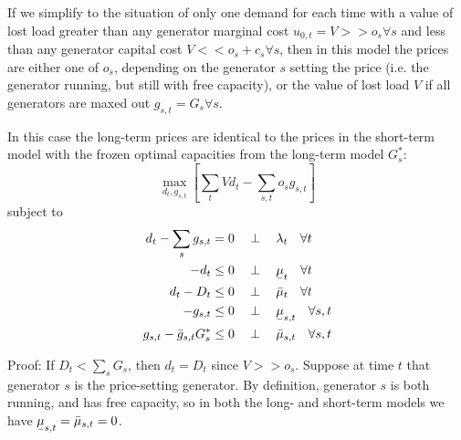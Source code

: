 \documentclass[final,3p,times]{elsarticle}
\def\l{\lambda} \def\K{\kappa} \def\m{\mu} \def\G{\Gamma} \def\d{\partial}
\begin{document}
If we simplify to the situation of only one demand for each time with a value of
lost load greater than any generator marginal cost $u_{0,t} = V >> o_s \forall
s$ and less than any generator capital cost $V << o_s + c_s \forall s$, then in
this model the prices are either one of $o_s$, depending on the generator $s$
setting the price (i.e. the generator running, but still with free capacity), or
the value of lost load $V$ if all generators are maxed out $g_{s,t} = G_s
\forall s$.

In this case the long-term prices are identical to the prices in the short-term
model with the frozen optimal capacities from the long-term model $G_{s}^*$:
\begin{equation}
  \max_{d_{t}, g_{s,t}}\left[\sum_{t} V d_{t}  - \sum_{s,t} o_{s} g_{s,t} \right]  \label{eq:objs}
\end{equation}
subject to
\begin{align}
  d_{t} - \sum_s g_{s,t}        & =  0 \hspace{0.34cm}\perp \hspace{0.34cm} \l_t \hspace{0.34cm} \forall t \label{eq:balance2}                  \\
  -d_{t}                        & \leq 0 \hspace{0.34cm}\perp \hspace{0.34cm} \ubar{\mu}_{t} \hspace{0.34cm} \forall t  \nonumber               \\
  d_{t} - D_{t}                 & \leq 0 \hspace{0.34cm}\perp \hspace{0.34cm} \bar{\mu}_{t} \hspace{0.34cm} \forall t\nonumber                  \\
  -g_{s,t}                      & \leq 0 \hspace{0.34cm}\perp \hspace{0.34cm} \ubar{\mu}_{s,t} \hspace{0.34cm} \forall s,t \nonumber            \\
  g_{s,t} - \bar{g}_{s,t} G^*_s & \leq 0 \hspace{0.34cm}\perp \hspace{0.34cm} \bar{\mu}_{s,t} \hspace{0.34cm} \forall s,t \label{eq:generation}
\end{align}

Proof: If $D_t < \sum_s G_{s}$, then $d_t = D_t$ since $V >> o_s$. Suppose at
time $t$ that generator $s$ is the price-setting generator. By definition,
generator $s$ is both running, and has free capacity, so in both the long- and
short-term models we have $\ubar{\mu}_{s,t} = \bar{\mu}_{s,t} = 0$.
\end{document}

